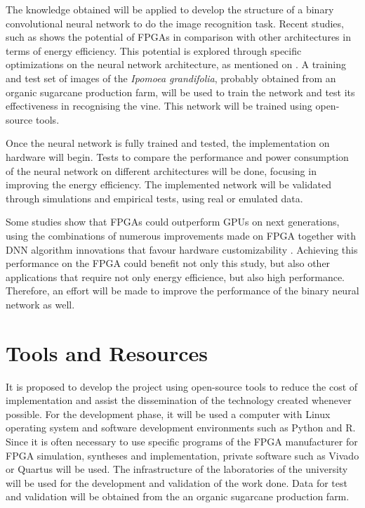 \documentclass[
	12pt,				%
	oneside,			%
	a4paper,			%
	brazil,			    %
	french,				%
	spanish,			%
	english,			%
	]{abntex2}
\begin{document}
The knowledge obtained will be applied to develop the structure of a binary convolutional neural network to do the image recognition task. Recent studies, such as \textcite{Nurvitadhi2017_0} shows the potential of FPGAs in comparison with other architectures in terms of energy efficiency. This potential is explored through specific optimizations on the neural network architecture, as mentioned on \textcites{Courbariaux2015, Zhang2017}. A training and test set of images of the \textit{Ipomoea grandifolia}, probably obtained from an organic sugarcane production farm, will be used to train the network and test its effectiveness in recognising the vine. This network will be trained using open-source tools.

Once the neural network is fully trained and tested, the implementation on hardware will begin. Tests to compare the performance and power consumption of the neural network on different architectures will be done, focusing in improving the energy efficiency. The implemented network will be validated through simulations and empirical tests, using real or emulated data.

Some studies show that FPGAs could outperform GPUs on next generations, using the combinations of numerous improvements made on FPGA together with DNN algorithm innovations that favour hardware customizability \cite{Nurvitadhi2017_1}. Achieving this performance on the FPGA could benefit not only this study, but also other applications that require not only energy efficience, but also high performance. Therefore, an effort will be made to improve the performance of the binary neural network as well.

\section{Tools and Resources}

  It is proposed to develop the project using open-source tools to reduce the cost of implementation and assist the dissemination of the technology created whenever possible. For the development phase, it will be used a computer with Linux operating system and software development environments such as Python and R. Since it is often necessary to use specific programs of the FPGA manufacturer for FPGA simulation, syntheses and implementation, private software such as Vivado or Quartus will be used. The infrastructure of the laboratories of the university will be used for the development and validation of the work done. Data for test and validation will be obtained from the an organic sugarcane production farm.
\end{document}
